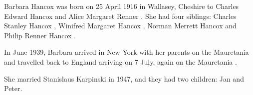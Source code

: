 
Barbara Hancox was born on 25 April 1916 in Wallasey, Cheshire to Charles Edward Hancox  and Alice Margaret Renner \cite{BarbaraHancoxBirth}.  She had four siblings: Charles Stanley Hancox , Winifred Margaret Hancox , Norman Merrett Hancox  and Philip Renner Hancox .

In June 1939, Barbara arrived in New York with her parents on the Mauretania  and travelled back to England arriving on 7 July, again on the Mauretania \cite{BarbaraHancoxTravel}.

She married Stanislaus Karpinski in 1947, and they had two children: Jan and Peter.

